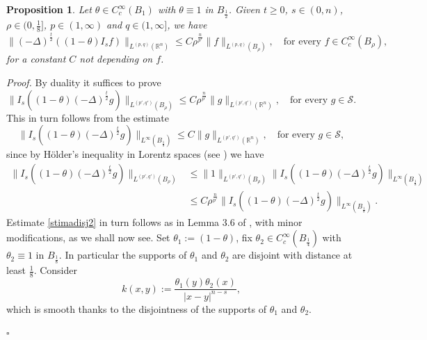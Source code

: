 \documentclass[11pt, a4paper]{article}
\newtheorem{prop}[trm]{Proposition}
\newcommand{\R}{\mathbb{R}}
\newenvironment{proof}{\noindent\emph{Proof.}}{\phantom{ } \hfill$\square$\medskip}
\begin{document}
\begin{prop}\label{propdisj} Let $\theta \in C^\infty_c(B_1)$ with $\theta\equiv 1$ in $B_\frac12$. Given $t\ge 0$, $s\in (0,n)$, $\rho\in (0,\tfrac18]$, $p\in (1,\infty)$ and $q\in (1,\infty]$, we have 
\begin{equation}\label{stimadisj}
\|(-\Delta)^\frac t2 ((1-\theta) I_s f)\|_{L^{(p,q)}(\R^n)} \le C \rho^\frac{n}{p'}\|f\|_{L^{(p,q)}(B_\rho)},\quad \text{for every } f\in C^\infty_c(B_\rho),
\end{equation}
for a constant $C$ not depending on $f$.
\end{prop}

\begin{proof} %
By duality it suffices to prove 
\begin{equation}\label{stimadisj}
\|I_s((1-\theta)(-\Delta)^\frac{t}{2} g)\|_{L^{(p',q')}(B_\rho)}\le C \rho^\frac{n}{p'}\|g\|_{L^{(p',q')}(\R^n)},\quad \text{for every }g\in \mathcal{S}.
\end{equation}
This in turn follows from the estimate
\begin{equation}\label{stimadisj2}
\|I_s((1-\theta)(-\Delta)^\frac{t}{2} g)\|_{L^\infty(B_\frac 18)}\le C \|g\|_{L^{(p',q')}(\R^n)}, \quad \text{for every }g\in \mathcal{S},
\end{equation}
since by H\"older's inequality in Lorentz spaces (see \cite{one}) we have
\[\begin{split}
\|I_s((1-\theta)(-\Delta)^\frac{t}{2} g)\|_{L^{(p',q')}(B_\rho)}& \le \|1\|_{L^{(p',q')}(B_\rho)} \|I_s((1-\theta)(-\Delta)^\frac{t}{2} g)\|_{L^\infty(B_\frac 18)}\\ 
&\le C \rho^\frac{n}{p'}  \|I_s((1-\theta)(-\Delta)^\frac{t}{2} g)\|_{L^\infty(B_\frac 18)}.\end{split}\]
Estimate \eqref{stimadisj2} in turn follows as in Lemma 3.6 of \cite{MMS}, with minor modifications, as we shall now see.
Set $\theta_1:=(1-\theta)$, fix $\theta_2\in C^\infty_c(B_\frac14)$ with $\theta_2\equiv 1$ in $B_\frac18$. In particular the supports of $\theta_1$ and $\theta_2$ are disjoint with distance at least $\frac 18$.
Consider
$$k(x,y):=\frac{\theta_1(y)\theta_2(x)}{|x-y|^{n-s}},$$
which is smooth thanks to the disjointness of the supports of $\theta_1$ and $\theta_2$.

\end{proof}
\end{document}
